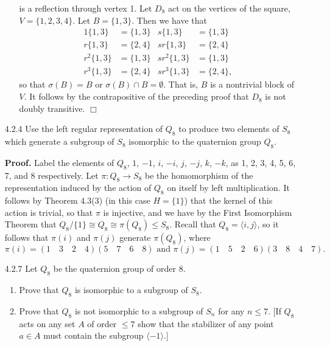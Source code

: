 \documentclass[9pt]{article}
\newcommand{\qed}{\hfill \ensuremath{\Box}}
\newcommand{\cyc}[1]{\langle #1 \rangle}
\begin{document}
\begin{enumerate}
\begin{enumerate}
               is a reflection through vertex 1. Let $D_8$ act on the vertices
               of the square, $V = \{1, 2, 3, 4\}$. Let $B = \{1 , 3\}$. Then we
               have that
               \begin{align*}
                  1\{1, 3\} &= \{1, 3\} & s\{1, 3\} &= \{1, 3\} \\
                  r\{1, 3\} &= \{2, 4\} & sr\{1, 3\} &= \{2, 4\} \\
                  r^2\{1, 3\} &= \{1, 3\} & sr^2\{1, 3\} &= \{1, 3\} \\
                  r^3\{1, 3\} &= \{2, 4\} & sr^3\{1, 3\} &= \{2, 4\},
               \end{align*}
               so that $\sigma(B) = B$ or $\sigma(B) \cap B = \emptyset$. That
               is, $B$ is a nontrivial block of $V$. It follows by the 
               contrapositive of the preceding proof that $D_8$ is not doubly
               transitive. \qed               
      \end{enumerate}
   \item[4.2.4]   Use the left regular representation of $Q_8$ to produce two
                  elements of $S_8$ which generate a subgroup of $S_8$
                  isomorphic to the quaternion group $Q_8$.
                  
      \textbf{Proof.} Label the elements of $Q_8$, $1$, $-1$, $i$, $-i$, $j$,
      $-j$, $k$, $-k$, as 1, 2, 3, 4, 5, 6, 7, and 8 respectively. Let
      $\pi : Q_8 \rightarrow S_8$ be the homomorphism of the representation
      induced by the action of $Q_8$ on itself by left multiplication. It
      follows by Theorem 4.3(3) (in this case $H = \{1\}$) that the kernel of
      this action is trivial, so that $\pi$ is injective, and we have by the
      First Isomorphism Theorem that
      $Q_8/\{1\} \cong Q_8 \cong \pi(Q_8) \le S_8$. Recall that
      $Q_8 = \cyc{i, j}$, so it follows that $\pi(i)$ and $\pi(j)$ generate
      $\pi(Q_8)$, where
      $$\pi(i) = (1 \quad 3 \quad 2 \quad 4)(5 \quad 7 \quad 6 \quad 8)
        \text{ and }
        \pi(j) = (1 \quad 5 \quad 2 \quad 6)(3 \quad 8 \quad 4 \quad 7).$$
   \item[4.2.7]   Let $Q_8$ be the quaternion group of order 8.
                  \begin{enumerate}
                     \item Prove that $Q_8$ is isomorphic to a subgroup of
                           $S_8$.
                     \item Prove that $Q_8$ is not isomorphic to a subgroup of
                           $S_n$ for any $n \le 7$. [If $Q_8$ acts on any set
                           $A$ of order $\le 7$ show that the stabilizer of any
                           point $a \in A$ must contain the subgroup
                           $\cyc{-1}$.]
                  \end{enumerate}
                  

\end{enumerate}
\end{document}
